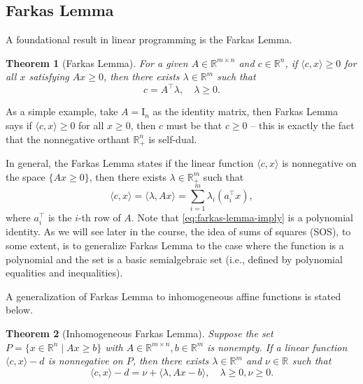 \documentclass[
]{book}
\newtheorem{theorem}{Theorem}[chapter]
\theoremstyle{definition}
\theoremstyle{definition}
\theoremstyle{definition}
\theoremstyle{definition}
\theoremstyle{remark}
\begin{document}
\hypertarget{farkas-lemma}{%
\subsection{Farkas Lemma}\label{farkas-lemma}}

A foundational result in linear programming is the Farkas Lemma.

\begin{theorem}[Farkas Lemma]
\protect\hypertarget{thm:FarkasLemma}{}\label{thm:FarkasLemma}For a given \(A \in \mathbb{R}^{m \times n}\) and \(c \in \mathbb{R}^{n}\), if \(\langle c, x \rangle \geq 0\) for all \(x\) satisfying \(Ax \geq 0\), then there exists \(\lambda \in \mathbb{R}^{m}\) such that
\[
c = A^\top\lambda, \quad \lambda \geq 0.
\]
\end{theorem}

As a simple example, take \(A = \mathrm{I}_n\) as the identity matrix, then Farkas Lemma says if \(\langle c, x \rangle \geq 0\) for all \(x \geq 0\), then \(c\) must be that \(c \geq 0\) -- this is exactly the fact that the nonnegative orthant \(\mathbb{R}^{n}_{+}\) is self-dual.

In general, the Farkas Lemma states if the linear function \(\langle c, x \rangle\) is nonnegative on the space \(\{ Ax \geq 0 \}\), then there exists \(\lambda \in \mathbb{R}^{m}_{+}\) such that
\begin{equation}
\langle c, x \rangle = \langle \lambda,  Ax \rangle = \sum_{i=1}^m \lambda_i (a_i^\top x),
\label{eq:farkas-lemma-imply}
\end{equation}
where \(a_i^\top\) is the \(i\)-th row of \(A\). Note that \eqref{eq:farkas-lemma-imply} is a polynomial identity. As we will see later in the course, the idea of sums of squares (SOS), to some extent, is to generalize Farkas Lemma to the case where the function is a polynomial and the set is a basic semialgebraic set (i.e., defined by polynomial equalities and inequalities).

A generalization of Farkas Lemma to inhomogeneous affine functions is stated below.

\begin{theorem}[Inhomogeneous Farkas Lemma]
\protect\hypertarget{thm:InhomogeneousFarkasLemma}{}\label{thm:InhomogeneousFarkasLemma}Suppose the set \(P = \{ x \in \mathbb{R}^{n} \mid A x \geq b \}\) with \(A \in \mathbb{R}^{m \times n}, b \in \mathbb{R}^{m}\) is nonempty. If a linear function \(\langle c, x \rangle - d\) is nonnegative on \(P\), then there exists \(\lambda \in \mathbb{R}^{m}\) and \(\nu \in \mathbb{R}^{}\) such that
\[
\langle c, x \rangle - d = \nu + \langle \lambda, A x - b \rangle, \quad \lambda \geq 0, \nu \geq 0. 
\]
\end{theorem}
\end{document}
